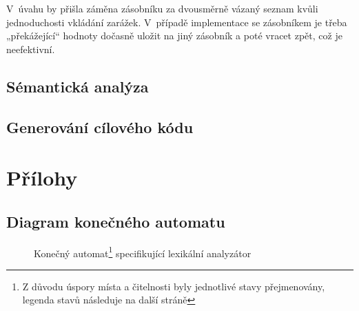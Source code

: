 \documentclass[a4paper,12pt]{article}
\begin{document}
V~úvahu by přišla záměna zásobníku za dvousměrně vázaný seznam kvůli jednoduchosti vkládání zarážek. V~případě implementace se zásobníkem je třeba „překážející“ hodnoty dočasně uložit na jiný zásobník a poté vracet zpět, což je neefektivní.

\clearpage

\subsection{Sémantická analýza}

\subsection{Generování cílového kódu}

\clearpage

\section{Přílohy}

\subsection{Diagram konečného automatu}

\begin{figure}[htp!]
	\centerline{}
	\begin{minipage}{\textwidth}
		\vspace{1.5em}
		\caption{Konečný automat\protect\footnote[2]{Z důvodu úspory místa a čitelnosti byly jednotlivé stavy přejmenovány, legenda stavů následuje na další stráně} specifikující lexikální analyzátor}
		\label{fig:DKA}
	\end{minipage}
\end{figure}

\clearpage
\end{document}
